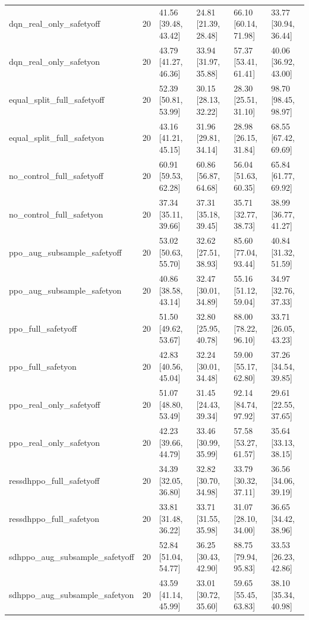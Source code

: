 \begin{table}[t]
\begin{tabular}{lrllll}
dqn\_real\_only\_safetyoff & 20 & 41.56 [39.48, 43.42] & 24.81 [21.39, 28.48] & 66.10 [60.14, 71.98] & 33.77 [30.94, 36.44] \\
dqn\_real\_only\_safetyon & 20 & 43.79 [41.27, 46.36] & 33.94 [31.97, 35.88] & 57.37 [53.41, 61.41] & 40.06 [36.92, 43.00] \\
equal\_split\_full\_safetyoff & 20 & 52.39 [50.81, 53.99] & 30.15 [28.13, 32.22] & 28.30 [25.51, 31.10] & 98.70 [98.45, 98.97] \\
equal\_split\_full\_safetyon & 20 & 43.16 [41.21, 45.15] & 31.96 [29.81, 34.14] & 28.98 [26.15, 31.84] & 68.55 [67.42, 69.69] \\
no\_control\_full\_safetyoff & 20 & 60.91 [59.53, 62.28] & 60.86 [56.87, 64.68] & 56.04 [51.63, 60.35] & 65.84 [61.77, 69.92] \\
no\_control\_full\_safetyon & 20 & 37.34 [35.11, 39.66] & 37.31 [35.18, 39.45] & 35.71 [32.77, 38.73] & 38.99 [36.77, 41.27] \\
ppo\_aug\_subsample\_safetyoff & 20 & 53.02 [50.63, 55.70] & 32.62 [27.51, 38.93] & 85.60 [77.04, 93.44] & 40.84 [31.32, 51.59] \\
ppo\_aug\_subsample\_safetyon & 20 & 40.86 [38.58, 43.14] & 32.47 [30.01, 34.89] & 55.16 [51.12, 59.04] & 34.97 [32.76, 37.33] \\
ppo\_full\_safetyoff & 20 & 51.50 [49.62, 53.67] & 32.80 [25.95, 40.78] & 88.00 [78.22, 96.10] & 33.71 [26.05, 43.23] \\
ppo\_full\_safetyon & 20 & 42.83 [40.56, 45.04] & 32.24 [30.01, 34.48] & 59.00 [55.17, 62.80] & 37.26 [34.54, 39.85] \\
ppo\_real\_only\_safetyoff & 20 & 51.07 [48.80, 53.49] & 31.45 [24.43, 39.34] & 92.14 [84.74, 97.92] & 29.61 [22.55, 37.65] \\
ppo\_real\_only\_safetyon & 20 & 42.23 [39.66, 44.79] & 33.46 [30.99, 35.99] & 57.58 [53.27, 61.57] & 35.64 [33.13, 38.15] \\
ressdhppo\_full\_safetyoff & 20 & 34.39 [32.05, 36.80] & 32.82 [30.70, 34.98] & 33.79 [30.32, 37.11] & 36.56 [34.06, 39.19] \\
ressdhppo\_full\_safetyon & 20 & 33.81 [31.48, 36.22] & 33.71 [31.55, 35.98] & 31.07 [28.10, 34.00] & 36.65 [34.42, 38.96] \\
sdhppo\_aug\_subsample\_safetyoff & 20 & 52.84 [51.04, 54.77] & 36.25 [30.43, 42.90] & 88.75 [79.94, 95.83] & 33.53 [26.23, 42.86] \\
sdhppo\_aug\_subsample\_safetyon & 20 & 43.59 [41.14, 45.99] & 33.01 [30.72, 35.60] & 59.65 [55.45, 63.83] & 38.10 [35.34, 40.98] \\

\end{tabular}
\end{table}
